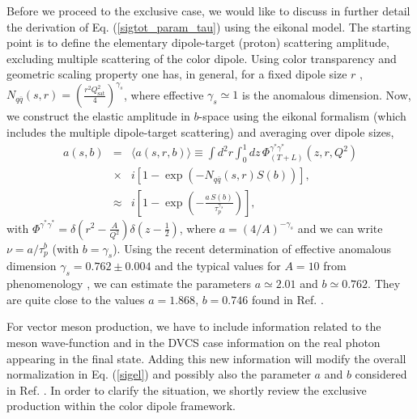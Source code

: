 \documentclass[twocolumn,showpacs,preprintnumbers,amsmath,amssymb,showkeys,aps,prd,a4paper,byrevtex]{revtex4}
\begin{document}
Before we proceed to the exclusive case, we would like to discuss in further detail the derivation of Eq. (\ref{sigtot_param_tau}) using the eikonal model. The starting point is to define the elementary dipole-target (proton)  scattering amplitude, excluding multiple scattering of the color dipole. Using color transparency and geometric scaling property one has, in general, for a fixed dipole size $r$  \cite{GBW}, $N_{q\bar{q}}(s,r) =\left( \frac{r^2Q_{\mathrm{sat}}^2}{4}\right)^{\gamma_s}$,  where effective $\gamma_s \simeq 1$ is the anomalous dimension. Now, we construct the elastic amplitude in $b$-space using the eikonal formalism (which includes the multiple dipole-target scattering)  and averaging over dipole sizes, 
\begin{eqnarray}
a(s,b) & = & \langle a(s,r,b) \rangle \equiv \int
  d^2r \int_0^1 dz \,\Phi^{\gamma^*\gamma^*}_{(T+L)}(z,r,Q^2) \nonumber \\&\times &  i\left[ 1-\exp\left(-N_{q\bar{q}}(s,r)S(b)\right) \right] ,\nonumber \\
&\approx &  i\left[ 1-\exp\left(-\frac{a\,S(b)}{\tau_p^{\gamma_s}}\right) \right],
\label{analitic}
\end{eqnarray}
with $\Phi^{\gamma^*\gamma^*} = \delta \left(r^2-\frac{A}{Q^2}\right) \delta\left(z-\frac{1}{2}\right)$, where $a = (4/A)^{-\gamma_s}$ and we can write $\nu= a/\tau_p^{b}$ (with $b=\gamma_s$). Using the recent determination of effective anomalous dimension $\gamma_s = 0.762 \pm 0.004$ \cite{Amir} and the typical values for $A=10$ from phenomenology \cite{McDermott}, we can estimate the parameters $a\simeq 2.01$ and $b\simeq 0.762$. They are quite close to the values $a=1.868$, $b=0.746$ found in Ref. \cite{Armesto_scal}.



For vector meson production, we have to include information related to the meson wave-function and in the DVCS case information on the real photon appearing in the final state. Adding this new information will modify the overall normalization in Eq. (\ref{sigel}) and possibly also the parameter $a$ and $b$ considered in Ref. \cite{Armesto_scal}. In order to clarify the situation, we shortly review the exclusive production within the color dipole framework. 
\end{document}
